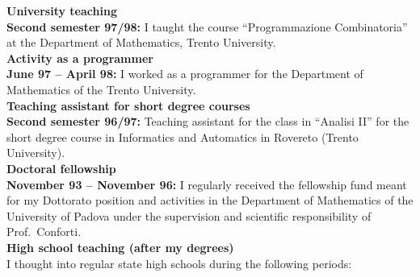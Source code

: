 \documentclass[10pt]{article}
\newcommand{\subvoice}[1] { {\large \bf #1} \smallskip\\ }
\begin{document}
\subvoice{University teaching}
{\bf Second semester 97/98:}
I taught the course ``Programmazione Combinatoria''
at the Department of Mathematics, Trento University.\\

\subvoice{Activity as a programmer}
{\bf June 97 -- April 98:}
I worked as a programmer
for the Department of Mathematics of the Trento University.\\

\subvoice{Teaching assistant for short degree courses}
{\bf Second semester 96/97:}
Teaching assistant for the class in ``Analisi II''
for the short degree course in Informatics and Automatics
in Rovereto (Trento University).\\

\subvoice{Doctoral fellowship}
{\bf November 93 -- November 96:}
I regularly received the fellowship fund
meant for my Dottorato position and activities
in the Department of Mathematics
of the University of Padova 
under the supervision
and scientific responsibility of Prof.~Conforti.\\

\subvoice{High school teaching (after my degrees)}
I thought into regular state high schools
during the following periods:\\
\end{document}
